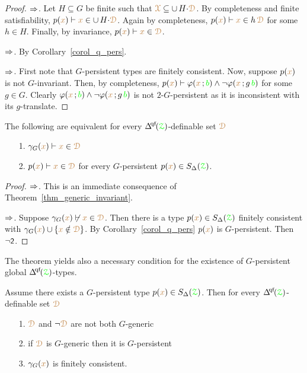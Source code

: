\begin{proof}
  $\Rightarrow$.
  Let $H\subseteq G$ be finite such that ${\color{brown}\EuScript X}\subseteq\cup\,H{\cdot}{\color{brown}\EuScript D}$.
  By completeness and finite satisfiability, $p({\color{brown} x})\vdash {\color{brown}x}\in\cup\,H{\cdot}{\color{brown}\EuScript D}$.
  Again by completeness, $p({\color{brown} x})\vdash {\color{brown}x}\in h\,{\color{brown}\EuScript D}$ for some $h\in H$.
  Finally, by invariance,  $p({\color{brown} x})\vdash{\color{brown}x}\in{\color{brown}\EuScript D}$.
  
  $\Rightarrow$.
  By Corollary~\ref{corol_q_pers}.

  $\Rightarrow$.
  First note that $G$-persistent types are finitely consistent.
  Now, suppose $p({\color{brown} x})$ is not $G$-invariant.
  Then, by completeness, $p({\color{brown} x})\vdash\varphi({\color{brown} x}\,;{\color{green} b})\wedge\neg\varphi({\color{brown} x}\,;g\,{\color{green} b})$ for some $g\in G$.
  Clearly $\varphi({\color{brown} x}\,;{\color{green} b})\wedge\neg\varphi({\color{brown} x}\,;g\,{\color{green} b})$ is not $2$-$G$-persistent as it is inconsistent with its $g$-translate.
\end{proof}

\begin{corollary}\label{corol_gammaG_invaqriancer}
  The following are equivalent for every $\qfDelta(\grZ)$-definable set ${\color{brown}\EuScript D}$
  \begin{itemize}
    \item [1.] $\gamma_G({\color{brown} x})\vdash{\color{brown}x}\in{\color{brown}\EuScript D}$
    \item [2.] $p({\color{brown} x})\vdash{\color{brown}x}\in{\color{brown}\EuScript D}$ for every $G$-persistent $p({\color{brown} x})\in S_\Delta({\color{green}\EuScript Z})$.
  \end{itemize}
\end{corollary}

\begin{proof}
  $\Rightarrow$.
  This is an immediate consequence of Theorem~\ref{thm_generic_invariant}.

  $\Rightarrow$.
  Suppose $\gamma_G({\color{brown} x})\not\vdash{\color{brown}x}\in{\color{brown}\EuScript D}$.
  Then there is a type $p({\color{brown} x})\in S_\Delta({\color{green}\EuScript Z})$ finitely consistent with $\gamma_G({\color{brown} x})\cup\{{\color{brown} x}\notin{\color{brown}\EuScript D}\}$.
  By Corollary~\ref{corol_q_pers} $p({\color{brown} x})$ is $G$-persistent.
  Then $\neg\textsf{\small 2}$.
\end{proof}

The theorem yields also a necessary condition for the existence of $G$-persistent global $\qfDelta({\grZ})$-types.

\begin{corollary}\label{corol_def_mu}
  Assume there exists a $G$-persistent type $p({\color{brown} x})\in S_\Delta({\color{green}\EuScript Z})$.
  Then for every $\qfDelta({\grZ})$-definable set ${\color{brown}\EuScript D}$
  \begin{itemize}
    \item[1.] ${\color{brown}\EuScript D}$ and $\neg{\color{brown}\EuScript D}$ are not both $G$-generic
    \item[2.] if ${\color{brown}\EuScript D}$ is $G$-generic then it is $G$-persistent
    \item[3.] $\gamma_G({\color{brown} x})$ is finitely consistent.
  \end{itemize}
\end{corollary}

